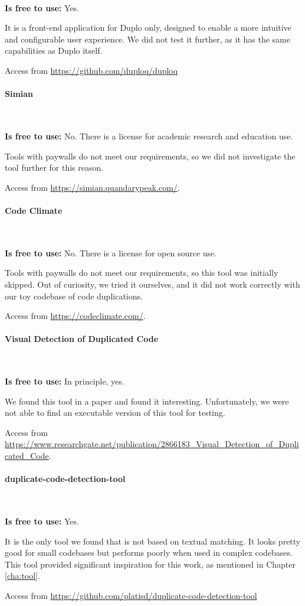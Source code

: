 \

\textbf{Is free to use:} Yes.

It is a front-end application for Duplo only, designed to 
enable a more intuitive and configurable user experience. 
We did not test it further, as it has the same capabilities 
as Duplo itself.

Access from
\url{https://github.com/duploq/duploq}

\paragraph{Simian} 

\

\textbf{Is free to use:} No. 
There is a license for academic research and education use.

Tools with paywalls do not meet our requirements, 
so we did not investigate the tool further for this reason.

Access from
\url{https://simian.quandarypeak.com/}.

\paragraph{Code Climate}

\

\textbf{Is free to use:} No. 
There is a license for open source use.

Tools with paywalls do not meet our requirements, so this 
tool was initially skipped. Out of curiosity, we tried it 
ourselves, and it did not work correctly with our toy
codebase of code duplications.

Access from
\url{https://codeclimate.com/}.

\paragraph{Visual Detection of Duplicated Code}

\

\textbf{Is free to use:} In principle, yes.

We found this tool in a paper and found it interesting. 
Unfortunately, we were not able to find an executable 
version of this tool for testing.

Access from
\url{https://www.researchgate.net/publication/2866183_Visual_Detection_of_Duplicated_Code}.

\paragraph{duplicate-code-detection-tool}

\

\textbf{Is free to use:} Yes.

It is the only tool we found that is not based on textual 
matching. It looks pretty good for small codebases but 
performs poorly when used in complex codebases. This tool 
provided significant inspiration for this work, as 
mentioned in Chapter \ref{cha:tool}.

Access from
\url{https://github.com/platisd/duplicate-code-detection-tool}


